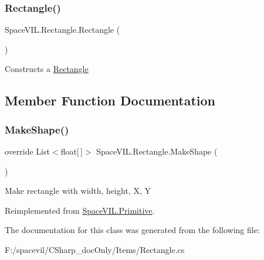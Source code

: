 \subsubsection{\texorpdfstring{Rectangle()}{Rectangle()}}
{\footnotesize\ttfamily Space\+V\+I\+L.\+Rectangle.\+Rectangle (\begin{DoxyParamCaption}{ }\end{DoxyParamCaption})}



Constructs a \mbox{\hyperlink{class_space_v_i_l_1_1_rectangle}{Rectangle}} 



\subsection{Member Function Documentation}
\mbox{\label{class_space_v_i_l_1_1_rectangle_acc0a5018e266efaa750459bb875eb805}} 
\subsubsection{\texorpdfstring{Make\+Shape()}{MakeShape()}}
{\footnotesize\ttfamily override List$<$float\mbox{[}$\,$\mbox{]}$>$ Space\+V\+I\+L.\+Rectangle.\+Make\+Shape (\begin{DoxyParamCaption}{ }\end{DoxyParamCaption})\hspace{0.3cm}{\ttfamily [virtual]}}



Make rectangle with width, height, X, Y 



Reimplemented from \mbox{\hyperlink{class_space_v_i_l_1_1_primitive_a4e7ed3f8d9e28e0063c36f4f2bf470cd}{Space\+V\+I\+L.\+Primitive}}.



The documentation for this class was generated from the following file\+:\begin{DoxyCompactItemize}
\item 
F\+:/spacevil/\+C\+Sharp\+\_\+doc\+Only/\+Items/Rectangle.\+cs\end{DoxyCompactItemize}
